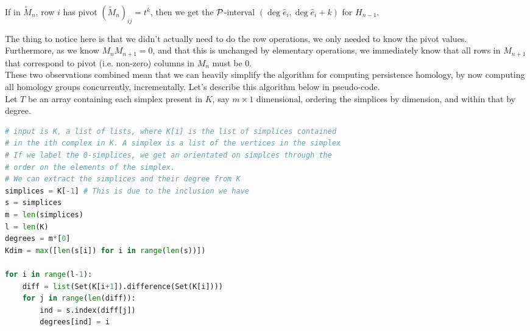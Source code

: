\documentclass{article}
\begin{document}
\begin{prop}
	If in $\tilde{M}_n$, row $i$ has pivot $(\tilde{M}_n)_{ij} = t^k$, then we get the $\mathcal{P}$-interval $(\deg \hat{e}_i, \deg \hat{e}_i + k)$ for $H_{n-1}$. 
\end{prop}

The thing to notice here is that we didn't actually need to do the row operations, we only needed to know the pivot values. \\
Furthermore, as we know $M_nM_{n+1}=0$, and that this is unchanged by elementary operations, we immediately know that all rows in $M_{n+1}$ that correspond to pivot (i.e. non-zero) columns in $M_n$ must be 0. \\
These two observations combined mean that we can heavily simplify the algorithm for computing persistence homology, by now computing all homology groups concurrently, incrementally. Let's describe this algorithm below in pseudo-code. \\
Let $T$ be an array containing each simplex present in $K$, say $m \times 1$ dimensional, ordering the simplices by dimension, and within that by degree.

\begin{lstlisting}[language=Python,frame=single]
# input is K, a list of lists, where K[i] is the list of simplices contained
# in the ith complex in K. A simplex is a list of the vertices in the simplex
# If we label the 0-simplices, we get an orientated on simplces through the 
# order on the elements of the simplex.
# We can extract the simplices and their degree from K
simplices = K[-1] # This is due to the inclusion we have
s = simplices
m = len(simplices)
l = len(K)
degrees = m*[0]
Kdim = max([len(s[i]) for i in range(len(s))])

for i in range(l-1):
	diff = list(Set(K[i+1]).difference(Set(K[i])))
	for j in range(len(diff)):
		ind = s.index(diff[j])
		degrees[ind] = i
\end{lstlisting}
\end{document}
